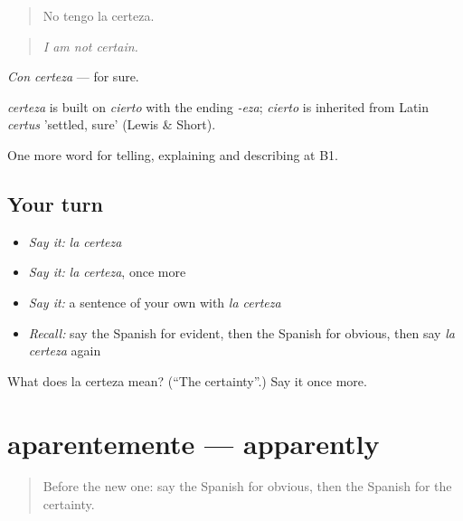 \begin{quote}
No tengo la certeza.
\end{quote}

\begin{quote}
\emph{I am not certain.}
\end{quote}

\emph{Con certeza} — for sure.

\begin{cousinweb}
\emph{certeza} is built on \emph{cierto} with the ending \emph{-eza}; \emph{cierto} is inherited from Latin \emph{certus} 'settled, sure' (Lewis \& Short).
\end{cousinweb}

\begin{grammarlens}[title={What you've built}]
One more word for telling, explaining and describing at B1.
\end{grammarlens}

\subsection*{Your turn}
\begin{itemize}
\raggedright
  \item \emph{Say it:} \emph{la certeza}
  \item \emph{Say it:} \emph{la certeza}, once more
  \item \emph{Say it:} a sentence of your own with \emph{la certeza}
  \item \emph{Recall:} say the Spanish for evident, then the Spanish for obvious, then say \emph{la certeza} again
\end{itemize}

\begin{tcolorbox}[breakable,colback=teal!4,colframe=teal!35!black,title={Before you move on}]
What does la certeza mean? (\textquotedblleft{}The certainty\textquotedblright{}.) Say it once more.
\end{tcolorbox}
\section[aparentemente]{aparentemente — apparently}

\label{lesson:ES-C587-aparentemente}



\begin{quote}
Before the new one: say the Spanish for obvious, then the Spanish for the certainty.
\end{quote}

